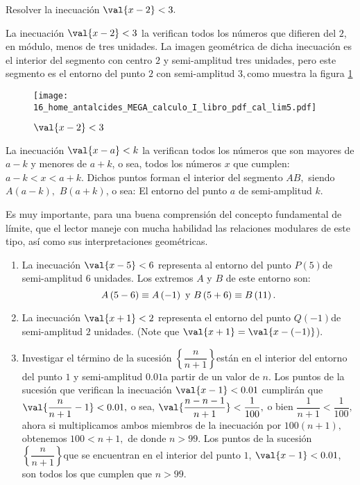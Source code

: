 \begin{ejemplo}\label{ej:ejem5cv}

Resolver la inecuación $\val{x-2}<3.$

\end{ejemplo}

\sol La inecuación $\val{x-2}<3$ la verifican todos los números
que difieren del $2$, en módulo, menos de tres unidades. La imagen
geométrica de dicha inecuación es el interior del segmento con centro
$2$ y semi-amplitud tres unidades, pero este segmento es el entorno
del punto $2$ con semi-amplitud $3,$como muestra la figura \ref{fig:cal_lim5}
\begin{figure}[H]
\centering\texttt{[image: 16\_home\_antalcides\_MEGA\_calculo\_I\_libro\_pdf\_cal\_lim5.pdf]}\caption{$\val{x-2}< 3$}\label{fig:cal_lim5}
\end{figure}
\fin

\general La inecuación $\val{x-a}<k$ la verifican todos los números
que son mayores de $a-k$ y menores de $a+k$, o sea, todos los números
$x$ que cumplen: $a-k<x<a+k.$  Dichos puntos
forman el interior del segmento $AB,$ siendo $A\left(a-k\right),$
$B\left(a+k\right)$, o sea: El entorno del punto $a$ de semi-amplitud
$k.$

\begin{nota}\peque

Es muy importante, para una buena comprensión del concepto fundamental
de límite, que el lector maneje con mucha habilidad las relaciones
modulares de este tipo, así como sus interpretaciones geométricas. 

\end{nota}

\begin{ejemplos}
\begin{enumerate}
\item La inecuación $\val{x-5}<6$ representa al entorno del punto $P\left(5\right)$de
semi-amplitud $6$ unidades. Los extremos $A$ y $B$ de este entorno
son: 
\[
A\left(5-6\right)\equiv A\left(-1\right)\text{ y \ensuremath{B\left(5+6\right)\equiv B\left(11\right).}}
\]
\item La inecuación $\val{x+1}<2$ representa el entorno del punto $Q\left(-1\right)$de
semi-amplitud $2$ unidades. (Note que $\val{x+1}=\val{x-\left(-1\right)}$).
\item Investigar el término de la sucesión $\left\{ \dfrac{n}{n+1}\right\} $están
en el interior del entorno del punto $1$ y semi-amplitud $0.01$a
partir de un valor de $n.$ \linebreak{}
\sol Los puntos de la sucesión que verifican la inecuación $\val{x-1}<0.01$
cumplirán que $\val{\dfrac{n}{n+1}-1}<0.01,$ o sea, $\val{\dfrac{n-n-1}{n+1}}<\dfrac{1}{100},$
o bien $\dfrac{1}{n+1}<\dfrac{1}{100},$ ahora si multiplicamos ambos
miembros de la inecuación por $100\left(n+1\right),$ obtenemos $100<n+1,$
de donde $n>99.$ \linebreak{}
\resp Los puntos de la sucesión $\left\{ \dfrac{n}{n+1}\right\} $que
se encuentran en el interior del punto $1$, $\val{x-1}<0.01$, son
todos los que cumplen que $n>99.$\fin
\end{enumerate}
\end{ejemplos}

